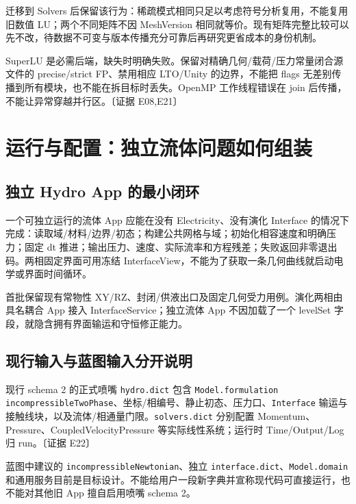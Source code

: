 \documentclass[UTF8,a4paper,11pt,fontset=fandol]{ctexart}
\newcommand{\code}[1]{\nolinkurl{#1}}
\newcommand{\ev}[1]{{\small\color{muted}〔证据 #1〕}}
\begin{document}
迁移到 Solvers 后保留该行为：稀疏模式相同只足以考虑符号分析复用，不能复用旧数值 LU；两个不同矩阵不因 MeshVersion 相同就等价。现有矩阵完整比较可以先不改，待数据不可变与版本传播充分可靠后再研究更省成本的身份机制。

SuperLU 是必需后端，缺失时明确失败。保留对精确几何/载荷/压力常量闭合源文件的 precise/strict FP、禁用相应 LTO/Unity 的边界，不能把 flags 无差别传播到所有模块，也不能在拆目标时丢失。OpenMP 工作线程错误在 join 后传播，不能让异常穿越并行区。\ev{E08,E21}

\section{运行与配置：独立流体问题如何组装}
\subsection{独立 Hydro App 的最小闭环}
一个可独立运行的流体 App 应能在没有 Electricity、没有演化 Interface 的情况下完成：读取域/材料/边界/初态；构建公共网格与域；初始化相容速度和明确压力；固定 dt 推进；输出压力、速度、实际流率和方程残差；失败返回非零退出码。两相固定界面可用冻结 InterfaceView，不能为了获取一条几何曲线就启动电学或界面时间循环。

首批保留现有常物性 XY/RZ、封闭/供液出口及固定几何受力用例。演化两相由具名耦合 App 接入 InterfaceService；独立流体 App 不因加载了一个 levelSet 字段，就隐含拥有界面输运和守恒修正能力。

\subsection{现行输入与蓝图输入分开说明}
现行 schema 2 的正式喷嘴 \code{hydro.dict} 包含 \code{Model.formulation incompressibleTwoPhase}、坐标/相编号、静止初态、压力口、\code{Interface} 输运与接触线块，以及流体/相通量门限。\code{solvers.dict} 分别配置 Momentum、Pressure、CoupledVelocityPressure 等实际线性系统；运行时 Time/Output/Log 归 run。\ev{E22}

蓝图中建议的 \code{incompressibleNewtonian}、独立 \code{interface.dict}、\code{Model.domain} 和通用服务目前是目标设计。不能给用户一段新字典并宣称现代码可直接运行，也不能对其他旧 App 擅自启用喷嘴 schema 2。
\end{document}
